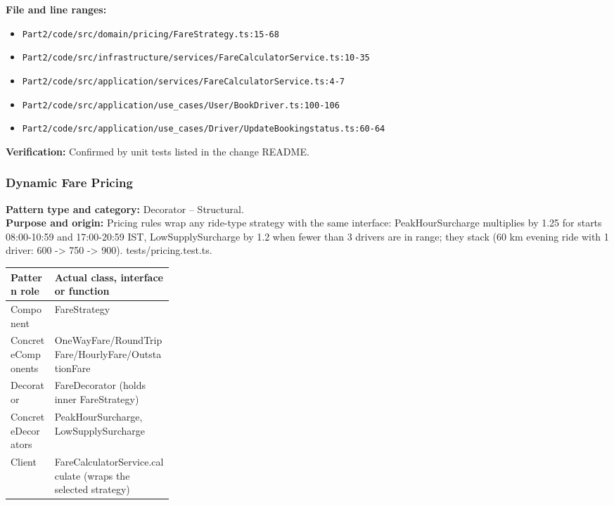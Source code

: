 \documentclass[11pt,a4paper]{article}
\begin{document}
\noindent\textbf{File and line ranges:}\begin{itemize}\setlength\itemsep{0pt}\item \texttt{Part2/\allowbreak{}code/\allowbreak{}src/\allowbreak{}domain/\allowbreak{}pricing/\allowbreak{}FareStrategy.\allowbreak{}ts:15-68}\item \texttt{Part2/\allowbreak{}code/\allowbreak{}src/\allowbreak{}infrastructure/\allowbreak{}services/\allowbreak{}FareCalculatorService.\allowbreak{}ts:10-35}\item \texttt{Part2/\allowbreak{}code/\allowbreak{}src/\allowbreak{}application/\allowbreak{}services/\allowbreak{}FareCalculatorService.\allowbreak{}ts:4-7}\item \texttt{Part2/\allowbreak{}code/\allowbreak{}src/\allowbreak{}application/\allowbreak{}use\_\allowbreak{}cases/\allowbreak{}User/\allowbreak{}BookDriver.\allowbreak{}ts:100-106}\item \texttt{Part2/\allowbreak{}code/\allowbreak{}src/\allowbreak{}application/\allowbreak{}use\_\allowbreak{}cases/\allowbreak{}Driver/\allowbreak{}UpdateBookingstatus.\allowbreak{}ts:60-64}\end{itemize}
\noindent\textbf{Verification:} Confirmed by unit tests listed in the change README.

\subsubsection*{Dynamic Fare Pricing}
\textbf{Pattern type and category:} Decorator -- Structural.\\
\textbf{Purpose and origin:} Pricing rules wrap any ride-type strategy with the same interface: PeakHourSurcharge multiplies by 1.25 for starts 08:00-10:59 and 17:00-20:59 IST, LowSupplySurcharge by 1.2 when fewer than 3 drivers are in range; they stack (60 km evening ride with 1 driver: 600 -\textgreater{} 750 -\textgreater{} 900). tests/pricing.test.ts.

\noindent\begin{tabularx}{\linewidth}{@{}P{0.27\linewidth}Y@{}}
\toprule Pattern role & Actual class, interface or function \\ \midrule
Component & FareStrategy \\
ConcreteComponents & OneWayFare/RoundTripFare/HourlyFare/OutstationFare \\
Decorator & FareDecorator (holds inner FareStrategy) \\
ConcreteDecorators & PeakHourSurcharge, LowSupplySurcharge \\
Client & FareCalculatorService.calculate (wraps the selected strategy) \\
\bottomrule
\end{tabularx}
\end{document}
